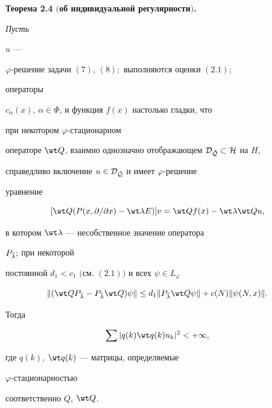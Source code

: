  


{\bf Теорема 2.4 $($об индивидуальной регулярности$)$.} {\it Пусть 


$u$ --- 


$\varphi$-решение задачи $(7)$, $(8);$ выполняются оценки $(2.1);$ 


операторы 


$c_\alpha(x)$, $\alpha\in\Phi$, и функция $f(x)$ настолько гладки, что 


при некотором $\varphi$-стационарном 


операторе $\wt Q$, взаимно однозначно отображающем $\cal D_{\Tilde 


Q}\subset H$ на $H$, 


справедливо включение $u\in\cal D_{\Tilde Q}$ и имеет $\varphi$-решение 


уравнение 


\begin{equation} 


[\wt Q(P(x,\partial/\partial x)-\wt\lambda E)]v=\wt Q f(x)- 


\wt\lambda\wt Q u, 


\end{equation} 


в котором $\wt\lambda$ --- несобственное значение оператора 


$P_{\Tilde\lambda};$ при некоторой 


постоянной $d_1<c_1$ $($см. $(2.1))$ и всех $\psi\in L_\varphi$ 


\begin{equation} 


\|(\wt Q P_{\Tilde\lambda}-P_{\Tilde\lambda}\wt Q)\psi\|\le 


d_1\|P_{\Tilde\lambda}\wt Q\psi\|+c(N)\|\psi(N,x)\|. 


\end{equation} 


Тогда 


\begin{equation} 


\sum|q(k)\wt q(k)u_k|^2<+\infty, 


\end{equation} 


где $q(k)$, $\wt q(k)$ --- матрицы, определяемые 


$\varphi$-стационарностью 


соответственно $Q$, $\wt Q$. 


}


 



